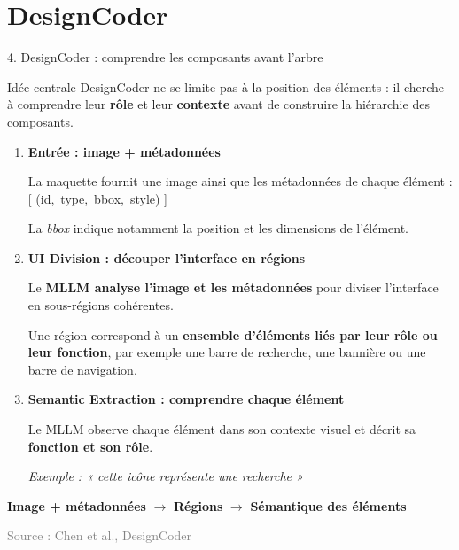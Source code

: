 \documentclass[aspectratio=169,11pt]{beamer}
\newcommand{\source}[1]{\scriptsize\textcolor{gray}{Source : #1}}
\begin{document}
\section{DesignCoder}
\begin{frame}{4. DesignCoder : comprendre les composants avant l'arbre}

\begin{block}{Idée centrale}
DesignCoder ne se limite pas à la position des éléments :
il cherche à comprendre leur \textbf{rôle} et leur \textbf{contexte}
avant de construire la hiérarchie des composants.
\end{block}

\begin{enumerate}

\item \textbf{Entrée : image + métadonnées}

La maquette fournit une image ainsi que les métadonnées de chaque
élément :
[
(id,\ type,\ bbox,\ style)
]

La \textit{bbox} indique notamment la position et les dimensions
de l'élément.

\item \textbf{UI Division : découper l'interface en régions}

Le \textbf{MLLM analyse l'image et les métadonnées} pour diviser
l'interface en sous-régions cohérentes.

Une région correspond à un \textbf{ensemble d'éléments liés par leur
rôle ou leur fonction}, par exemple une barre de recherche,
une bannière ou une barre de navigation.

\item \textbf{Semantic Extraction : comprendre chaque élément}

Le MLLM observe chaque élément dans son contexte visuel et décrit
sa \textbf{fonction et son rôle}.

\begin{center}
\textit{Exemple : « cette icône représente une recherche »}
\end{center}

\end{enumerate}

\vspace{0.2cm}

\begin{center}
\textbf{Image + métadonnées}
$\rightarrow$
\textbf{Régions}
$\rightarrow$
\textbf{Sémantique des éléments}
\end{center}

\source{Chen et al., DesignCoder}
\end{frame}
\end{document}

